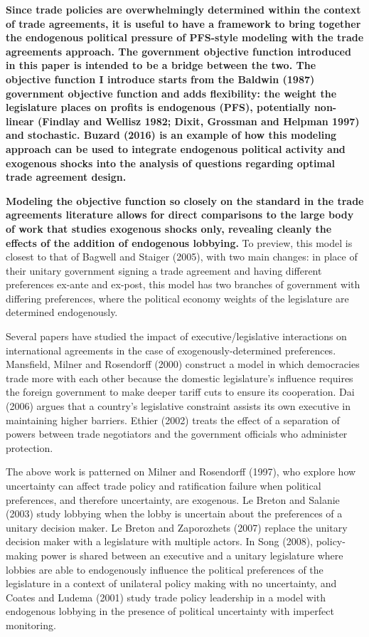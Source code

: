 \documentclass[10pt]{article}
\begin{document}
\textbf{Since trade policies are overwhelmingly determined within the context of trade agreements, it is useful to have a framework to bring together the endogenous political pressure of PFS-style modeling with the trade agreements approach. The government objective function introduced in this paper is intended to be a bridge between the two. The objective function I introduce starts from the Baldwin (1987) government objective function and adds flexibility: the weight the legislature places on profits is endogenous (PFS), potentially non-linear (Findlay and Wellisz 1982; Dixit, Grossman and Helpman 1997) and stochastic. Buzard (2016) is an example of how this modeling approach can be used to integrate  endogenous political activity and exogenous shocks into the analysis of questions regarding optimal trade agreement design.}

\textbf{Modeling the objective function so closely on the standard in the trade agreements literature allows for direct comparisons to the large body of work that studies exogenous shocks only, revealing cleanly the effects of the addition of endogenous lobbying.} To preview, this model is closest to that of Bagwell and Staiger (2005), with two main changes: in place of their unitary government signing a trade agreement and having different preferences ex-ante and ex-post, this model has two branches of government with differing preferences, where the political economy weights of the legislature are determined endogenously.
		
Several papers have studied the impact of executive/legislative interactions on international agreements in the case of exogenously-determined preferences. Mansfield, Milner and Rosendorff (2000) construct a model in which democracies trade more with each other because the domestic legislature's influence requires the foreign government to make deeper tariff cuts to ensure its cooperation. Dai (2006) argues that a country's legislative constraint assists its own executive in maintaining higher barriers. Ethier (2002) treats the effect of a separation of powers between trade negotiators and the government officials who administer protection.

The above work is patterned on Milner and Rosendorff (1997), who explore how uncertainty can affect trade policy and ratification failure when political preferences, and therefore uncertainty, are exogenous. Le Breton and Salanie (2003) study lobbying when the lobby is uncertain about the preferences of a unitary decision maker. Le Breton and Zaporozhets (2007) replace the unitary decision maker with a legislature with multiple actors. In Song (2008), policy-making power is shared between an executive and a unitary legislature where lobbies are able to endogenously influence the political preferences of the legislature in a context of unilateral policy making with no uncertainty, and Coates and Ludema (2001) study trade policy leadership in a model with endogenous lobbying in the presence of political uncertainty with imperfect monitoring.
\end{document}
